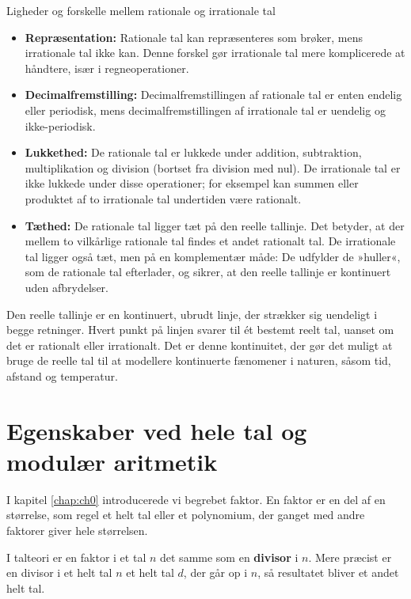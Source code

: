 \begin{custombox}{Ligheder og forskelle mellem rationale og irrationale tal}
    \begin{itemize}
    \item \textbf{Repræsentation:} Rationale tal kan repræsenteres som brøker, mens irrationale tal ikke kan. Denne forskel gør irrationale tal mere komplicerede at håndtere, især i regneoperationer.

    \item \textbf{Decimalfremstilling:} Decimalfremstillingen af rationale tal er enten endelig eller periodisk, mens decimalfremstillingen af irrationale tal er uendelig og ikke-periodisk.

    \item \textbf{Lukkethed:} De rationale tal er lukkede under addition, subtraktion, multiplikation og division (bortset fra division med nul). De irrationale tal er ikke lukkede under disse operationer; for eksempel kan summen eller produktet af to irrationale tal undertiden være rationalt.

    \item \textbf{Tæthed:} De rationale tal ligger tæt på den reelle tallinje. Det betyder, at der mellem to vilkårlige rationale tal findes et andet rationalt tal. De irrationale tal ligger også tæt, men på en komplementær måde: De udfylder de »huller«, som de rationale tal efterlader, og sikrer, at den reelle tallinje er kontinuert uden afbrydelser.
\end{itemize}
\end{custombox}

Den reelle tallinje er en kontinuert, ubrudt linje, der strækker sig uendeligt i begge retninger. Hvert punkt på linjen svarer til ét bestemt reelt tal, uanset om det er rationalt eller irrationalt. Det er denne kontinuitet, der gør det muligt at bruge de reelle tal til at modellere kontinuerte fænomener i naturen, såsom tid, afstand og temperatur.

\section{Egenskaber ved hele tal og modulær aritmetik}
I kapitel \ref{chap:ch0} introducerede vi begrebet faktor. En faktor er en del af en størrelse, som regel et helt tal eller et polynomium, der ganget med andre faktorer giver hele størrelsen.

I talteori er en faktor i et tal \(n\) det samme som en \textbf{divisor} i \(n\). Mere præcist er en divisor i et helt tal \(n\) et helt tal \(d\), der går op i \(n\), så resultatet bliver et andet helt tal.

